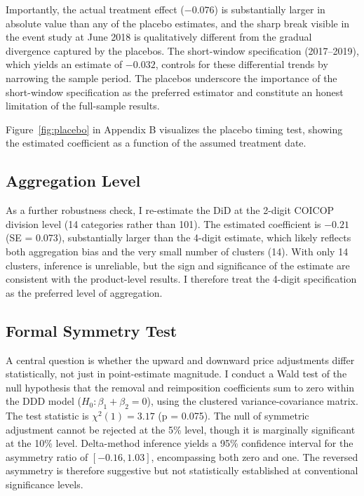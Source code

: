 \documentclass[12pt]{article}
\begin{document}
Importantly, the actual treatment effect ($-0.076$) is substantially larger in absolute value than any of the placebo estimates, and the sharp break visible in the event study at June 2018 is qualitatively different from the gradual divergence captured by the placebos. The short-window specification (2017--2019), which yields an estimate of $-0.032$, controls for these differential trends by narrowing the sample period. The placebos underscore the importance of the short-window specification as the preferred estimator and constitute an honest limitation of the full-sample results.

Figure~\ref{fig:placebo} in Appendix B visualizes the placebo timing test, showing the estimated coefficient as a function of the assumed treatment date.

\subsection{Aggregation Level}

As a further robustness check, I re-estimate the DiD at the 2-digit COICOP division level (14 categories rather than 101). The estimated coefficient is $-0.21$ (SE = 0.073), substantially larger than the 4-digit estimate, which likely reflects both aggregation bias and the very small number of clusters (14). With only 14 clusters, inference is unreliable, but the sign and significance of the estimate are consistent with the product-level results. I therefore treat the 4-digit specification as the preferred level of aggregation.

\subsection{Formal Symmetry Test}

A central question is whether the upward and downward price adjustments differ statistically, not just in point-estimate magnitude. I conduct a Wald test of the null hypothesis that the removal and reimposition coefficients sum to zero within the DDD model ($H_0: \beta_1 + \beta_2 = 0$), using the clustered variance-covariance matrix. The test statistic is $\chi^2(1) = 3.17$ (p = 0.075). The null of symmetric adjustment cannot be rejected at the 5\% level, though it is marginally significant at the 10\% level. Delta-method inference yields a 95\% confidence interval for the asymmetry ratio of $[-0.16, 1.03]$, encompassing both zero and one. The reversed asymmetry is therefore suggestive but not statistically established at conventional significance levels.
\end{document}
